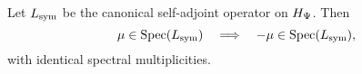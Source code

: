\begin{lemma}
\label{lem:spectral_symmetry}
Let $L_{\mathrm{sym}}$ be the canonical self-adjoint operator on $H_{\Psi}$. Then
\[
\mu \in \operatorname{Spec}(L_{\mathrm{sym}}) \quad \Longrightarrow \quad -\mu \in \operatorname{Spec}(L_{\mathrm{sym}}),
\]
with identical spectral multiplicities.
\end{lemma}
